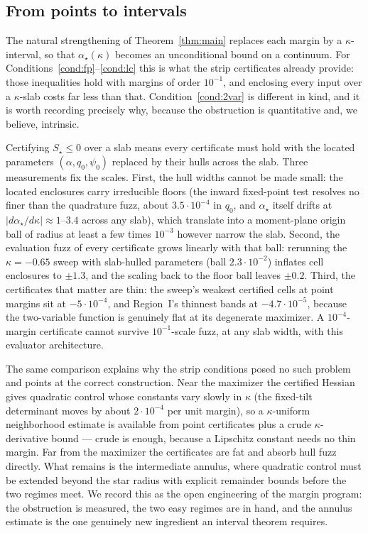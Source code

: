 
\subsection{From points to intervals}
\label{sec:interval}

The natural strengthening of Theorem~\ref{thm:main} replaces each
margin by a $\kappa$-interval, so that $\alpha_\star(\kappa)$ becomes
an unconditional bound on a continuum.  For
Conditions~\ref{cond:fp}--\ref{cond:lc} this is what the strip
certificates already provide: those inequalities hold with margins of
order $10^{-1}$, and enclosing every input over a $\kappa$-slab costs
far less than that.  Condition~\ref{cond:2var} is different in kind,
and it is worth recording precisely why, because the obstruction is
quantitative and, we believe, intrinsic.

Certifying $S_\star\le 0$ over a slab means every certificate must
hold with the located parameters $(\alpha, q_0, \psi_0)$ replaced by
their hulls across the slab.  Three measurements fix the scales.
First, the hull widths cannot be made small: the located enclosures
carry irreducible floors (the inward fixed-point test resolves no
finer than the quadrature fuzz, about $3.5\cdot10^{-4}$ in $q_0$, and
$\alpha_\star$ itself drifts at $|d\alpha_\star/d\kappa|\approx
1$--$3.4$ across any slab), which translate into a moment-plane
origin ball of radius at least a few times $10^{-3}$ however narrow
the slab.  Second, the evaluation fuzz of every certificate grows
linearly with that ball: rerunning the $\kappa=-0.65$ sweep with
slab-hulled parameters (ball $2.3\cdot10^{-2}$) inflates cell
enclosures to $\pm 1.3$, and the scaling back to the floor ball
leaves $\pm 0.2$.  Third, the certificates that matter are thin:
the sweep's weakest certified cells at point margins sit at
$-5\cdot10^{-4}$, and Region~I's thinnest bands at $-4.7\cdot10^{-5}$,
because the two-variable function is genuinely flat at its degenerate
maximizer.  A $10^{-4}$-margin certificate cannot survive
$10^{-1}$-scale fuzz, at any slab width, with this evaluator
architecture.

The same comparison explains why the strip conditions posed no such
problem and points at the correct construction.  Near the maximizer
the certified Hessian gives quadratic control whose constants vary
slowly in $\kappa$ (the fixed-tilt determinant moves by about
$2\cdot10^{-4}$ per unit margin), so a $\kappa$-uniform neighborhood
estimate is available from point certificates plus a crude
$\kappa$-derivative bound --- crude is enough, because a Lipschitz
constant needs no thin margin.  Far from the maximizer the
certificates are fat and absorb hull fuzz directly.  What remains is
the intermediate annulus, where quadratic control must be extended
beyond the star radius with explicit remainder bounds before the two
regimes meet.  We record this as the open engineering of the margin
program: the obstruction is measured, the two easy regimes are in
hand, and the annulus estimate is the one genuinely new ingredient an
interval theorem requires.

